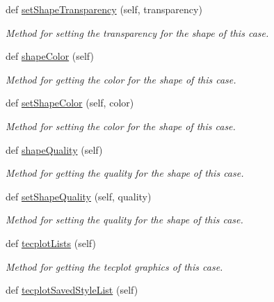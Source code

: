 \begin{DoxyCompactItemize}
def \hyperlink{classdata__structure_1_1case__node_1_1_case_node_ac24fbc54a83a04a8ea3d20f058b3a196}{set\+Shape\+Transparency} (self, transparency)
\begin{DoxyCompactList}\small\item\em Method for setting the transparency for the shape of this case. \end{DoxyCompactList}\item 
def \hyperlink{classdata__structure_1_1case__node_1_1_case_node_aedc74c039a8da3960544f0694e2379b0}{shape\+Color} (self)
\begin{DoxyCompactList}\small\item\em Method for getting the color for the shape of this case. \end{DoxyCompactList}\item 
def \hyperlink{classdata__structure_1_1case__node_1_1_case_node_a9eb860e45595b4a1c4d018c259d9d930}{set\+Shape\+Color} (self, color)
\begin{DoxyCompactList}\small\item\em Method for setting the color for the shape of this case. \end{DoxyCompactList}\item 
def \hyperlink{classdata__structure_1_1case__node_1_1_case_node_a333ce56e7787cb1d23974a75182facca}{shape\+Quality} (self)
\begin{DoxyCompactList}\small\item\em Method for getting the quality for the shape of this case. \end{DoxyCompactList}\item 
def \hyperlink{classdata__structure_1_1case__node_1_1_case_node_a7bc800f55127489e601b7ddbaa6ad2cb}{set\+Shape\+Quality} (self, quality)
\begin{DoxyCompactList}\small\item\em Method for setting the quality for the shape of this case. \end{DoxyCompactList}\item 
def \hyperlink{classdata__structure_1_1case__node_1_1_case_node_a5fda7f2cc9d0dd56ad8e088447decd15}{tecplot\+Lists} (self)
\begin{DoxyCompactList}\small\item\em Method for getting the tecplot graphics of this case. \end{DoxyCompactList}\item 
def \hyperlink{classdata__structure_1_1case__node_1_1_case_node_ae868c48f3c348062424b040c2e7f4646}{tecplot\+Saved\+Style\+List} (self)

\end{DoxyCompactItemize}
